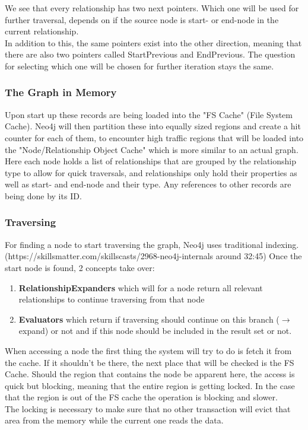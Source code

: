 \noindent
We see that every relationship has two next pointers. Which one will be used for further traversal, depends on if the source node is start- or end-node in the current relationship. \\
In addition to this, the same pointers exist into the other direction, meaning that there are also two pointers called StartPrevious and EndPrevious. The question for selecting which one will be chosen for further iteration stays the same.

\subsubsection{The Graph in Memory}
Upon start up these records are being loaded into the "FS Cache" (File System Cache). Neo4j will then partition these into equally sized regions and create a hit counter for each of them, to encounter high traffic regions that will be loaded into the "Node/Relationship Object Cache" which is more similar to an actual graph. \\
Here each node holds a list of relationships that are grouped by the relationship type to allow for quick traversals, and relationships only hold their properties as well as start- and end-node and their type. Any references to other records are being done by its ID. 

\subsubsection{Traversing}
For finding a node to start traversing the graph, Neo4j uses traditional indexing. (https://skillsmatter.com/skillscasts/2968-neo4j-internals around 32:45) Once the start node is found, 2 concepts take over:
\begin{enumerate}
\item \textbf{RelationshipExpanders} which will for a node return all relevant relationships to continue traversing from that node
\item \textbf{Evaluators} which return if traversing should continue on this branch ($ \rightarrow $ expand) or not and if this node should be included in the result set or not.
\end{enumerate}
When accessing a node the first thing the system will try to do is fetch it from the cache. If it shouldn't be there, the next place that will be checked is the FS Cache. Should the region that contains the node be apparent here, the access is quick but blocking, meaning that the entire region is getting locked. In the case that the region is out of the FS cache the operation is blocking and slower. \\
The locking is necessary to make sure that no other transaction will evict that area from the memory while the current one reads the data.

